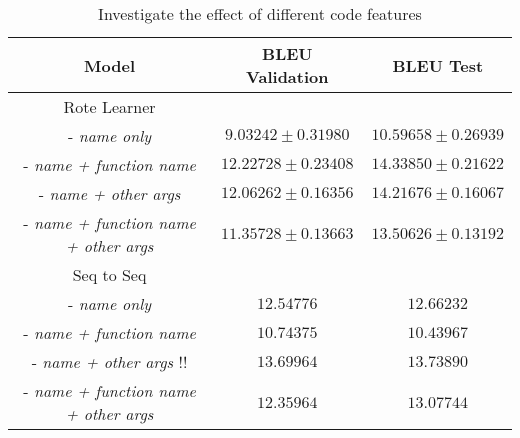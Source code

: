 \begin{table}[!ht]
\begin{center}
\begin{tabular}{ c | c | c }
    Model                               & BLEU Validation            & BLEU Test  \\
    \hline
    \hline
    Rote Learner                        &                  & \\    
    - \textit{name only}                & $ 9.03242  \pm  0.31980 $ & $ 10.59658 \pm 0.26939 $  \\
    - \textit{name + function name}     & $ 12.22728 \pm  0.23408 $ & $ 14.33850 \pm 0.21622 $  \\
    - \textit{name + other args}        & $ 12.06262 \pm  0.16356 $ & $ 14.21676 \pm 0.16067 $  \\
    - \textit{name + function name + other args}  & $ 11.35728 \pm  0.13663 $ & $ 13.50626 \pm 0.13192 $ \\
    \hline
    \hline
    Seq to Seq                          &                  & \\
    - \textit{name only}                & $ 12.54776 $ & $ 12.66232 $  \\
    - \textit{name + function name}     & $ 10.74375 $ & $ 10.43967 $  \\
    - \textit{name + other args}  !!    & $ 13.69964 $ & $ 13.73890 $  \\
    - \textit{name + function name + other args}    & $ 12.35964 $ & $ 13.07744 $  \\

    
    \hline
\end{tabular}
\caption {Investigate the effect of different code features}
\label{table:tokenization}
\end{center}
\end{table}





